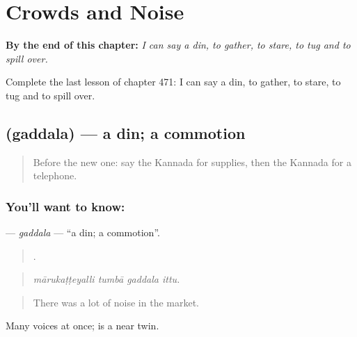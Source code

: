 
\chapter{Crowds and Noise}
\label{ch:ka-crowds-and-noise}

\begin{chapteropening}
\textbf{By the end of this chapter:} \emph{I can say a din, to gather, to stare, to tug and to spill over.}

Complete the last lesson of chapter 471: I can say a din, to gather, to stare, to tug and to spill over.
\end{chapteropening}

\section[\texorpdfstring{\kn{ಗದ್ದಲ} (gaddala)}{ಗದ್ದಲ (gaddala)}]{ (gaddala) — a din; a commotion}

\label{lesson:KA-C471-gaddala}



\begin{quote}
Before the new one: say the Kannada for supplies, then the Kannada for a telephone.
\end{quote}

\subsection*{You'll want to know: }
\textbf{} — \emph{gaddala} — \textquotedblleft{}a din; a commotion\textquotedblright{}.

\begin{quote}
   .
\end{quote}

\begin{quote}
\emph{mārukaṭṭeyalli tumbā gaddala ittu.}
\end{quote}

\begin{quote}
There was a lot of noise in the market.
\end{quote}

Many voices at once;  is a near twin.

